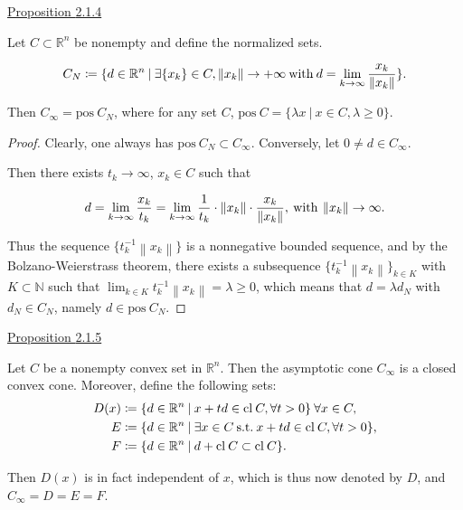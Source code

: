 \documentclass[a4paper,11pt]{jsarticle}
\newcommand{\PROPOSITION}[2]{\begin{itembox}[l]{\underline{Proposition {#1} }}{#2}\end{itembox}}
\newcommand{\NaturalNumberSet}{\mathbb{N}}
\newcommand{\NDemenstionalRealEuclideanSpace}{\mathbb{R}^n}
\newcommand{\SuchThat}{\:\text{s.t.}\:}
\begin{document}
\PROPOSITION{2.1.4}{
  Let $C \subset \NDemenstionalRealEuclideanSpace$ be nonempty and define the normalized sets.

  \begin{equation}
    C_N \coloneqq \{d \in \NDemenstionalRealEuclideanSpace \:|\: \exists \{x_k\} \in C, \left\lVert x_k \right\rVert \rightarrow +\infty \:\text{with}\: d = \lim_{k \to \infty} \frac{x_k}{\left\lVert x_k \right\rVert }\}. \notag
  \end{equation}

  Then $C_{\infty} = \text{pos}\:C_N$, where for any set $C$, $\text{pos}\:C = \{\lambda x \:|\: x \in C, \lambda \geq 0\}$.
}

\begin{proof}
  Clearly, one always has $\text{pos}\:C_N \subset C_{\infty}$. Conversely, let $0 \ne d \in C_{\infty}$.

  Then there exists $t_k \rightarrow \infty$, $x_k \in C$ such that

  \begin{equation}
    d = \lim_{k \to \infty} \frac{x_k}{t_k} = \lim_{k \to \infty} \frac{1}{t_k} \cdot \left\lVert x_k \right\rVert \cdot \frac{x_k}{\left\lVert x_k \right\rVert }, \:\text{with}\: \left\lVert x_k \right\rVert \rightarrow \infty. \notag
  \end{equation}

  Thus the sequence $\{t_k^{-1}\left\lVert x_k \right\rVert \}$ is a nonnegative bounded sequence, and by the Bolzano-Weierstrass theorem, there exists a subsequence $\{t_k^{-1}\left\lVert x_k \right\rVert\}_{k \in K}$ with $K \subset \NaturalNumberSet$ such that $\lim_{k \in K} t_k^{-1} \left\lVert x_k \right\rVert = \lambda \geq 0$, which means that $d = \lambda d_N$ with $d_N \in C_N$, namely $d \in \text{pos}\:C_N$.
\end{proof}

\PROPOSITION{2.1.5}{
  Let $C$ be a nonempty convex set in $\NDemenstionalRealEuclideanSpace$. Then the asymptotic cone $C_{\infty}$ is a closed convex cone. Moreover, define the following sets:
  \begin{equation}
    \begin{split}
      D(x) &\coloneqq \{d \in \NDemenstionalRealEuclideanSpace \:|\: x + td \in \text{cl}\:C, \forall t >0\}\: \forall x \in C, \\
      E &\coloneqq \{d \in \NDemenstionalRealEuclideanSpace \:|\: \exists x \in C \SuchThat x + td \in \text{cl}\:C, \forall t > 0\}, \\
      F &\coloneqq \{d \in \NDemenstionalRealEuclideanSpace \:|\: d + \text{cl}\:C \subset \text{cl}\:C\}. \notag
    \end{split}
  \end{equation}

  Then $D(x)$ is in fact independent of $x$, which is thus now denoted by $D$, and $C_{\infty} = D = E = F$.
}
\end{document}
